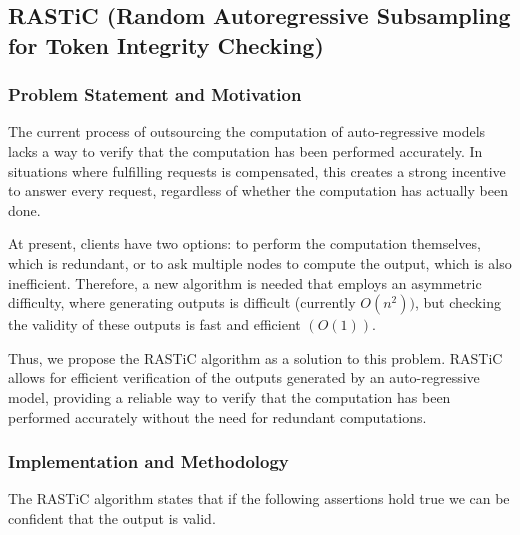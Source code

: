 \documentclass{article}
\begin{document}
\subsection{\ac{RASTiC} (Random Autoregressive Subsampling for Token Integrity Checking)} 
\subsubsection{Problem Statement and Motivation}
The current process of outsourcing the computation of auto-regressive models lacks a way to verify that the computation has been performed accurately. 
In situations where fulfilling requests is compensated, this creates a strong incentive to answer every request, regardless of whether the computation has actually been done.

At present, clients have two options: to perform the computation themselves, which is redundant, or to ask multiple nodes to compute the output, which is also inefficient. 
Therefore, a new algorithm is needed that employs an asymmetric difficulty, where generating outputs is difficult (currently $O(n^2))$, but checking the validity of these outputs is fast and efficient $(O(1))$.

Thus, we propose the \ac{RASTiC} algorithm as a solution to this problem.
\ac{RASTiC} allows for efficient verification of the outputs generated by an auto-regressive model, providing a reliable way to verify that the computation has been performed accurately without the need for redundant computations.
\subsubsection{Implementation and Methodology}
The \ac{RASTiC} algorithm states that if the following assertions hold true we can be confident that the output is valid.
\end{document}
